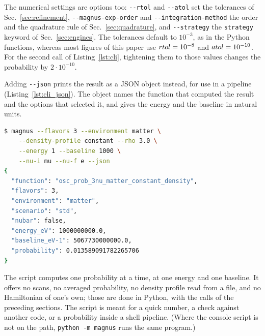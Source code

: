 \documentclass[final,5p,times,twocolumn,sort,compress]{elsarticle}
\makeatletter
\DeclareRobustCommand{\_}{%
  \ifmmode\nfss@text{\textunderscore}\else\textunderscore\allowbreak\fi}
\makeatother
\begin{document}
The numerical settings are options too: {\tt -{}-rtol} and {\tt -{}-atol} set the tolerances of Sec.~\ref{sec:refinement}, {\tt -{}-magnus-exp-order} and {\tt -{}-integration-method} the order and the quadrature rule of Sec.~\ref{sec:quadrature}, and {\tt -{}-strategy} the {\tt strategy} keyword of Sec.~\ref{sec:engines}. The tolerances default to $10^{-3}$, as in the Python functions, whereas most figures of this paper use ${\tt rtol} = 10^{-8}$ and ${\tt atol} = 10^{-10}$. For the second call of Listing~\ref{lst:cli}, tightening them to those values changes the probability by $2 \cdot 10^{-10}$.

Adding {\tt -{}-json} prints the result as a JSON object instead, for use in a pipeline (Listing~\ref{lst:cli_json}). The object names the function that computed the result and the options that selected it, and gives the energy and the baseline in natural units.

\begin{lstlisting}[language=bash, caption={\textbf{Command-line output as JSON.} The $\nu_\mu \to \nu_e$ entry of the matrix of Listing~\ref{lst:cli}, printed as JSON: the function that computed it, the options that selected that function, the energy and the baseline in natural units, and the probability. See Sec.~\ref{sec:cli} for details.}, label={lst:cli_json}, float=tbp]
$ magnus --flavors 3 --environment matter \
    --density-profile constant --rho 3.0 \
    --energy 1 --baseline 1000 \
    --nu-i mu --nu-f e --json
{
  "function": "osc_prob_3nu_matter_constant_density",
  "flavors": 3,
  "environment": "matter",
  "scenario": "std",
  "nubar": false,
  "energy_eV": 1000000000.0,
  "baseline_eV-1": 5067730000000.0,
  "probability": 0.013589091782265706
}
\end{lstlisting}

The script computes one probability at a time, at one energy and one baseline. It offers no scans, no averaged probability, no density profile read from a file, and no Hamiltonian of one's own; those are done in Python, with the calls of the preceding sections. The script is meant for a quick number, a check against another code, or a probability inside a shell pipeline. (Where the console script is not on the path, {\tt python -m magnus} runs the same program.)

\end{document}
